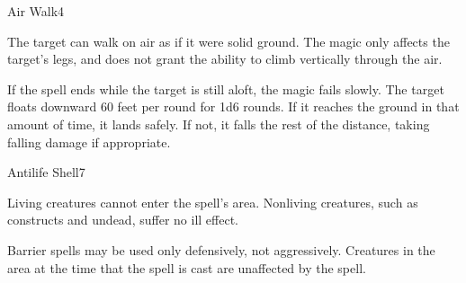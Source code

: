 \begin{spellsection}{Air Walk}{4}
    \begin{spellheader}
    \end{spellheader}
    \begin{spellcontent}
        \begin{spelltargetinginfo}
        \end{spelltargetinginfo}
        \begin{spelleffects}
            \spelleffect The target can walk on air as if it were solid ground. The magic only affects the target's legs, and does not grant the ability to climb vertically through the air.
            \par If the spell ends while the target is still aloft, the magic fails slowly. The target floats downward 60 feet per round for 1d6 rounds. If it reaches the ground in that amount of time, it lands safely. If not, it falls the rest of the distance, taking falling damage if appropriate.
            \spelldur \durshort
        \end{spelleffects}
    \end{spellcontent}
    \begin{spellfooter}
        \miscastexplode
    \end{spellfooter}
\end{spellsection}

\begin{spellsection}{Antilife Shell}{7}
    \begin{spellheader}
    \end{spellheader}
    \begin{spellcontent}
        \begin{spelltargetinginfo}
        \end{spelltargetinginfo}
        \begin{spelleffects}
            \spelleffect Living creatures cannot enter the spell's area. Nonliving creatures, such as constructs and undead, suffer no ill effect.
            \spelldur \durmed \dismissable
        \end{spelleffects}
    \end{spellcontent}
    \begin{spellfooter}
        \spellnotes Barrier spells may be used only defensively, not aggressively. Creatures in the area at the time that the spell is cast are unaffected by the spell.
        \miscastexplode
    \end{spellfooter}
\end{spellsection}

